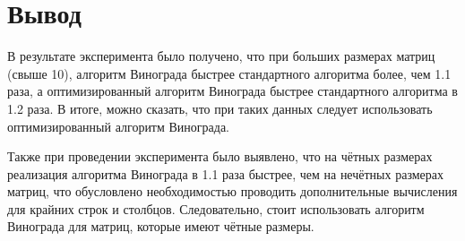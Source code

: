 \section*{Вывод}

В результате эксперимента было получено, что при больших размерах матриц (свыше 10), алгоритм Винограда быстрее стандартного алгоритма более, чем 1.1 раза, а оптимизированный алгоритм Винограда быстрее стандартного алгоритма в 1.2 раза. В итоге, можно сказать, что при таких данных следует использовать оптимизированный алгоритм Винограда.

Также при проведении эксперимента было выявлено, что на чётных размерах реализация алгоритма Винограда в 1.1 раза быстрее, чем на нечётных размерах матриц, что обусловлено необходимостью проводить дополнительные вычисления для крайних строк и столбцов.  Следовательно, стоит использовать алгоритм Винограда для матриц, которые имеют чётные размеры.